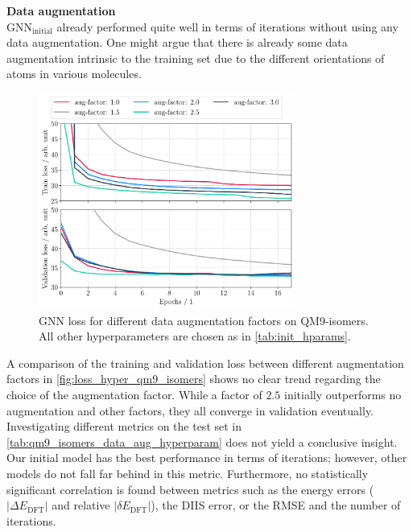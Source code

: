 \textbf{Data augmentation}\\
$\text{GNN}_\text{initial}$ already performed quite well in terms of iterations without using any data augmentation. One might argue that there is already some data augmentation intrinsic to the training set due to the different orientations of atoms in various molecules. 
\begin{figure}[H]
    \centering
    \includegraphics[width=0.75\textwidth]{../fig/application/aug_train_val_loss.pdf}
    \caption[GNN loss for different augmentation factors on QM9-isomers]{GNN loss for different data augmentation factors on QM9-isomers. All other hyperparameters are chosen as in \autoref{tab:init_hparams}.}
    \label{fig:loss_hyper_qm9_isomers}
\end{figure}
A comparison of the training and validation loss between different augmentation factors in \autoref{fig:loss_hyper_qm9_isomers} shows no clear trend regarding the choice of the augmentation factor. While a factor of $2.5$ initially outperforms no augmentation and other factors, they all converge in validation eventually. 
Investigating different metrics on the test set in \autoref{tab:qm9_isomers_data_aug_hyperparam} does not yield a conclusive insight. Our initial model has the best performance in terms of iterations; however, other models do not fall far behind in this metric. Furthermore, no statistically significant correlation is found between metrics such as the energy errors ($|\Delta E_\text{DFT}|$ and relative $|\delta E_\text{DFT}|$), the DIIS error, or the RMSE and the number of iterations.

